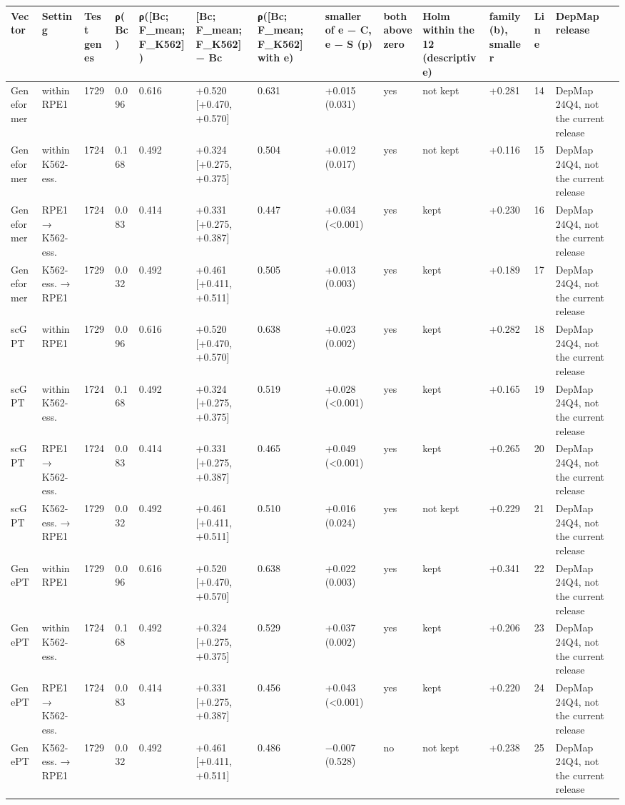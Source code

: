 \begin{tabular}{lllllllllllll}
\toprule
Vector & Setting & Test genes & ρ(Bc) & ρ([Bc; F\_mean; F\_K562]) & [Bc; F\_mean; F\_K562] − Bc & ρ([Bc; F\_mean; F\_K562] with e) & smaller of e − C, e − S (p) & both above zero & Holm within the 12 (descriptive) & family (b), smaller & Line & DepMap release \\
\midrule
Geneformer & within RPE1 & 1729 & 0.096 & 0.616 & +0.520 [+0.470, +0.570] & 0.631 & +0.015 (0.031) & yes & not kept & +0.281 & 14 & DepMap 24Q4, not the current release \\
Geneformer & within K562-ess. & 1724 & 0.168 & 0.492 & +0.324 [+0.275, +0.375] & 0.504 & +0.012 (0.017) & yes & not kept & +0.116 & 15 & DepMap 24Q4, not the current release \\
Geneformer & RPE1 → K562-ess. & 1724 & 0.083 & 0.414 & +0.331 [+0.275, +0.387] & 0.447 & +0.034 (<0.001) & yes & kept & +0.230 & 16 & DepMap 24Q4, not the current release \\
Geneformer & K562-ess. → RPE1 & 1729 & 0.032 & 0.492 & +0.461 [+0.411, +0.511] & 0.505 & +0.013 (0.003) & yes & kept & +0.189 & 17 & DepMap 24Q4, not the current release \\
scGPT & within RPE1 & 1729 & 0.096 & 0.616 & +0.520 [+0.470, +0.570] & 0.638 & +0.023 (0.002) & yes & kept & +0.282 & 18 & DepMap 24Q4, not the current release \\
scGPT & within K562-ess. & 1724 & 0.168 & 0.492 & +0.324 [+0.275, +0.375] & 0.519 & +0.028 (<0.001) & yes & kept & +0.165 & 19 & DepMap 24Q4, not the current release \\
scGPT & RPE1 → K562-ess. & 1724 & 0.083 & 0.414 & +0.331 [+0.275, +0.387] & 0.465 & +0.049 (<0.001) & yes & kept & +0.265 & 20 & DepMap 24Q4, not the current release \\
scGPT & K562-ess. → RPE1 & 1729 & 0.032 & 0.492 & +0.461 [+0.411, +0.511] & 0.510 & +0.016 (0.024) & yes & not kept & +0.229 & 21 & DepMap 24Q4, not the current release \\
GenePT & within RPE1 & 1729 & 0.096 & 0.616 & +0.520 [+0.470, +0.570] & 0.638 & +0.022 (0.003) & yes & kept & +0.341 & 22 & DepMap 24Q4, not the current release \\
GenePT & within K562-ess. & 1724 & 0.168 & 0.492 & +0.324 [+0.275, +0.375] & 0.529 & +0.037 (0.002) & yes & kept & +0.206 & 23 & DepMap 24Q4, not the current release \\
GenePT & RPE1 → K562-ess. & 1724 & 0.083 & 0.414 & +0.331 [+0.275, +0.387] & 0.456 & +0.043 (<0.001) & yes & kept & +0.220 & 24 & DepMap 24Q4, not the current release \\
GenePT & K562-ess. → RPE1 & 1729 & 0.032 & 0.492 & +0.461 [+0.411, +0.511] & 0.486 & −0.007 (0.528) & no & not kept & +0.238 & 25 & DepMap 24Q4, not the current release \\
\bottomrule
\end{tabular}
